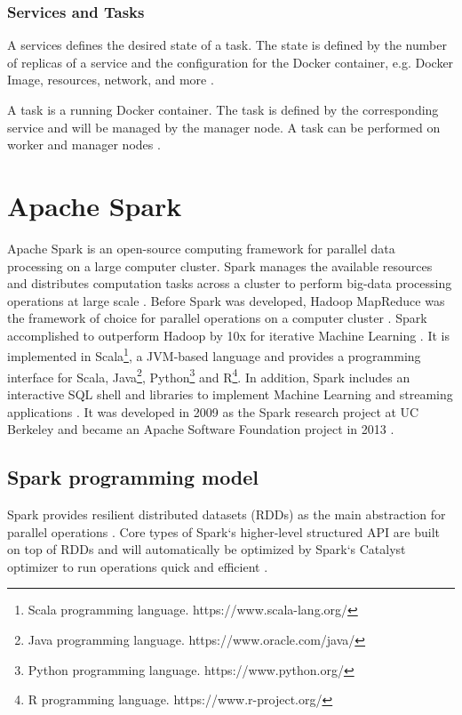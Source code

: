 \subsubsection{Services and Tasks}
A services defines the desired state of a task. The state is defined by the number of replicas of a service and the configuration for the Docker container, e.g. Docker Image, resources, network, and more \cite{Docker2020Docs}.


A task is a running Docker container. The task is defined by the corresponding service and will be managed by the manager node. A task can be performed on worker and manager nodes \cite{Docker2020Docs}.


\section{Apache Spark}
\label{sec:04_spark}
Apache Spark is an open-source computing framework for parallel data processing on a large computer cluster. Spark manages the available resources and distributes computation tasks across a cluster to perform big-data processing operations at large scale \cite{Chambers2018Spark}. Before Spark was developed, Hadoop MapReduce \cite{Dean2010MapReduce} was the framework of choice for parallel operations on a computer cluster \cite{Zaharia2010Spark}. Spark accomplished to outperform Hadoop by 10x for iterative Machine Learning \cite{Zaharia2010Spark}. It is implemented in Scala\footnote{Scala programming language. https://www.scala-lang.org/}, a JVM-based language and provides a programming interface for Scala, Java\footnote{Java programming language. https://www.oracle.com/java/}, Python\footnote{Python programming language. https://www.python.org/} and R\footnote{R programming language. https://www.r-project.org/}. In addition, Spark includes an interactive SQL shell and libraries to implement Machine Learning and streaming applications \cite{Chambers2018Spark}.
It was developed in 2009 as the Spark research project at UC Berkeley and became an Apache Software Foundation project in 2013 \cite{Chambers2018Spark}. 


\subsection{Spark programming model}
\label{subsec:04_spark_pr-model}
Spark provides resilient distributed datasets (RDDs) as the main abstraction for parallel operations \cite{Zaharia2010Spark}. Core types of Spark`s higher-level structured API are built on top of RDDs \cite{Chambers2018Spark} and will automatically be optimized by Spark`s Catalyst optimizer to run operations quick and efficient \cite{Hien2018Spark}.



